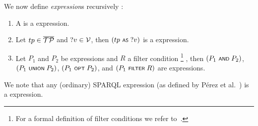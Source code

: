 	We now define \emph{{\SPARQLplus} expression}s recursively :
\begin{enumerate}
	\item A \emph{\TPplus} is a {\SPARQLplus} expression.
	\item Let $tp \in \overline{\mathcal{TP}}$ and $?v \in \mathcal{V}$, then $(tp \text{ \normalfont\scriptsize\textsf{AS} } ?v)$ is a {\SPARQLplus} expression.
	\item Let $P_1$ and $P_2$ be {\SPARQLplus} expressions and $R$ a filter condition%
		\footnote{For a formal definition of
		filter conditions we refer to~\cite{Perez09:SemanticsAndComplexityOfSPARQL}.}%
	, then $(P_1 \text{ \normalfont\scriptsize\textsf{AND} } P_2)$, $(P_1 \text{ \normalfont\scriptsize\textsf{UNION} } P_2)$, $(P_1 \text{ \normalfont\scriptsize\textsf{OPT} } P_2)$, and $(P_1 \text{ \normalfont\scriptsize\textsf{FILTER} } R)$ are {\SPARQLplus} expressions.
\end{enumerate}

\begin{note}
		We note that any
	(ordinary) SPARQL expression (as defined by P\'{e}rez et al.~\cite{Perez09:SemanticsAndComplexityOfSPARQL}) is a {\SPARQLplus} expression.
\end{note}

